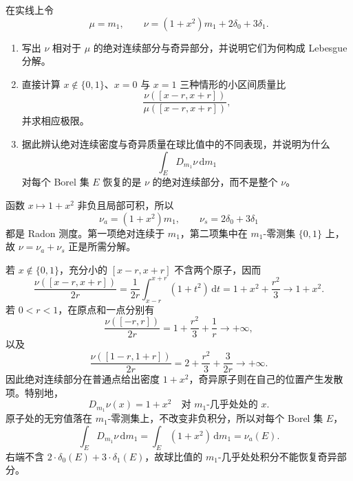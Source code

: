 \BookExercises


\begin{exercise}[绝对连续部分与奇异部分的球比值]\label{b1:ex:14-ac-singular-ball-ratios}
在实线上令
\[
 \mu=m_1,\qquad
 \nu=(1+x^2)m_1+2\delta_0+3\delta_1.
\]
\begin{enumerate}
\item\label{b1:item:14-explicit-decomposition}
写出 \(\nu\) 相对于 \(\mu\) 的绝对连续部分与奇异部分，并说明它们为何构成 Lebesgue 分解。
\item\label{b1:item:14-explicit-ball-ratios}
直接计算 \(x\notin\{0,1\}\)、\(x=0\) 与 \(x=1\) 三种情形的小区间质量比
\[
 \frac{\nu([x-r,x+r])}{\mu([x-r,x+r])},
\]
并求相应极限。
\item\label{b1:item:14-explicit-recovery}
据此辨认绝对连续密度与奇异质量在球比值中的不同表现，并说明为什么
\[
 \int_E D_{m_1}\nu\,\mathrm dm_1
\]
对每个 Borel 集 \(E\) 恢复的是 \(\nu\) 的绝对连续部分，而不是整个 \(\nu\)。
\end{enumerate}
\end{exercise}
\begin{solution}
函数 \(x\mapsto1+x^2\) 非负且局部可积，所以
\[
 \nu_a=(1+x^2)m_1,\qquad \nu_s=2\delta_0+3\delta_1
\]
都是 Radon 测度。第一项绝对连续于 \(m_1\)，第二项集中在 \(m_1\)-零测集 \(\{0,1\}\) 上，故 \(\nu=\nu_a+\nu_s\) 正是所需分解。

若 \(x\notin\{0,1\}\)，充分小的 \([x-r,x+r]\) 不含两个原子，因而
\[
 \frac{\nu([x-r,x+r])}{2r}
 =\frac1{2r}\int_{x-r}^{x+r}(1+t^2)\,\mathrm dt
 =1+x^2+\frac{r^2}{3}
 \longrightarrow1+x^2.
\]
若 \(0<r<1\)，在原点和一点分别有
\[
 \frac{\nu([-r,r])}{2r}
 =1+\frac{r^2}{3}+\frac1r\longrightarrow+\infty,
\]
以及
\[
 \frac{\nu([1-r,1+r])}{2r}
 =2+\frac{r^2}{3}+\frac3{2r}\longrightarrow+\infty.
\]
因此绝对连续部分在普通点给出密度 \(1+x^2\)，奇异原子则在自己的位置产生发散项。特别地，
\[
 D_{m_1}\nu(x)=1+x^2
 \quad\text{对 }m_1\text{-几乎处处的 }x.
\]
原子处的无穷值落在 \(m_1\)-零测集上，不改变非负积分，所以对每个 Borel 集 \(E\)，
\[
 \int_E D_{m_1}\nu\,\mathrm dm_1
 =\int_E(1+x^2)\,\mathrm dm_1
 =\nu_a(E).
\]
右端不含 \(2\cdot \delta_0(E)+3\cdot \delta_1(E)\)，故球比值的 \(m_1\)-几乎处处积分不能恢复奇异部分。
\end{solution}

